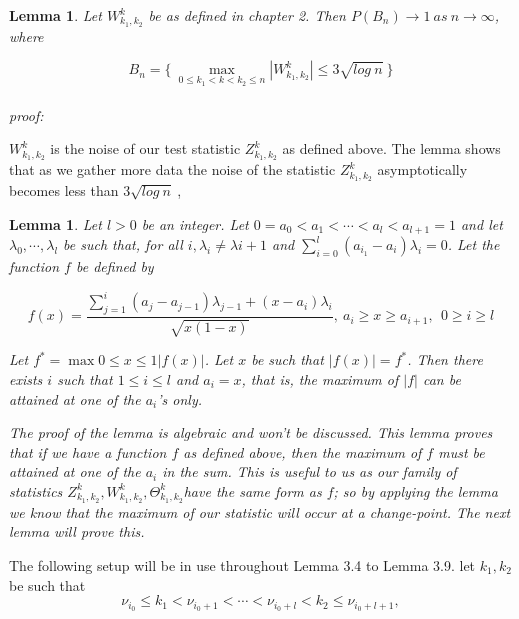 \documentclass[a4paper, 12pt, notitlepage]{report}
\newtheorem{lemma}[theorem]{Lemma}
\begin{document}
\begin{lemma}

Let \( W^k_{k_1,k_2}\) be as defined in chapter 2. Then $ \displaystyle P(B_n) \to 1\  as\ n \to \infty $, where
 
   \[B_n =\Big \{ \ \max_{0 \leq k_1 < k < k_2 \leq n} | W^k_{k_1, k_2}| \leq 3\sqrt{log\ n}\ \Big  \} \]
\\
proof:

\end{lemma}



 \( W^k_{k_1,k_2}\) is the noise of our test statistic  \( Z^k_{k_1,k_2}\) as defined above. The lemma shows that as we gather more data the noise of the statistic  \( Z^k_{k_1,k_2}\) asymptotically becomes less than \( 3\sqrt{log\ n}\ \), 

\begin{lemma}
%
Let \( l > 0\) be an integer. Let \(0 = a_0 < a_1< \cdots < a_l < a_{l+1} = 1\) and let \(\lambda_0, \cdots , \lambda_l\) be such that, for all \(i, \lambda_i \neq \lambda{i+1}\) and \(\sum^l_{i = 0}(a_{i_1} - a_i)\lambda_i = 0\). Let the function $f$ be defined by

\[f(x) = \frac{\sum^i_{j=1}(a_j - a_{j-1})\lambda_{j-1} + (x - a_i)\lambda_i}{\sqrt{x(1- x)}},\  a_i \geq x \geq a_{i+1},\ \  0\geq i \geq l \]

Let \(f^* = \max{0 \leq x \leq 1}|f(x)|\). Let $x$ be such that $|f(x)| = f^*$. Then there exists $i$ such that \(1 \leq i \leq l\) and \( a_i = x\), that is, the maximum of $|f|$ can be attained at one of the $a_i$'s only. \newline 


The proof of the lemma is algebraic and won't be discussed. This lemma proves that if we have a function $f$ as defined above, then the maximum of $f$ must be attained at one of the \(a_i\) in the sum. This is useful to us as our family of statistics \(Z^k_{k_1, k_2}, W^k_{k_1, k_2}, \Theta^k_{k_1, k_2} \)have the same form as $f$; so by applying the lemma we know that the maximum of our statistic will occur at a change-point. The next lemma will prove this.
\end{lemma}
%
The following setup will be in use throughout Lemma 3.4 to Lemma 3.9. let \(k_1, k_2\) be such that \[\nu_{i_0} \leq k_1 < \nu_{i_0+1} < \cdots < \nu_{i_0+l} < k_2 \leq \nu_{i_0+l+1},\]
\end{document}
